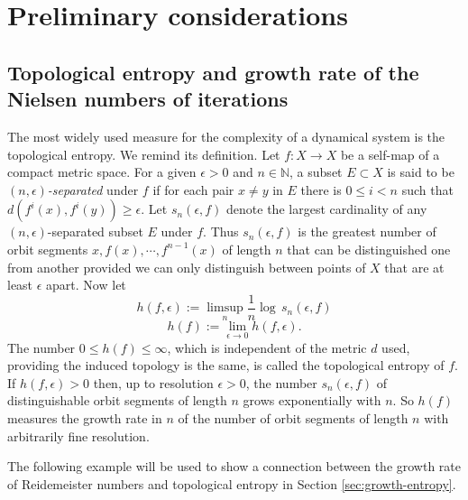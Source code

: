 \documentclass[12pt, a4paper]{amsart}
\def\N{{\mathbb N}}
\begin{document}
\section{Preliminary considerations }\label{sec:preliminary}

\subsection{Topological entropy and  growth rate  of the Nielsen numbers of iterations}\label{EC}

The most widely used measure for the complexity of a dynamical system is the topological
entropy. We remind its definition.
Let $ f: X \rightarrow X $ be a self-map of a compact metric space. For a given $\epsilon > 0 $
and $ n \in \N$, a subset $E \subset X$ is said to be \emph{$(n,\epsilon)$-separated} under $f$ if for
each pair $x \not= y$ in $E$ there is $0 \leq i <n $ such that $ d(f^i(x), f^i(y)) \geq \epsilon$.
Let $s_n(\epsilon,f)$  denote the largest cardinality of any $(n,\epsilon)$-separated subset $E$
under $f$. Thus  $s_n(\epsilon,f)$ is the greatest number of orbit segments ${x,f(x),\cdots,f^{n-1}(x)}$
of length $n$ that can be distinguished one from another provided we can only distinguish
between points of $X$ that are  at least $\epsilon$ apart.
Now let
$$
  h(f,\epsilon):= \limsup_{n} \frac{1}{n}\log \,s_n(\epsilon,f)
$$
$$
  h(f):=\lim_{\epsilon \rightarrow 0} h(f,\epsilon).
$$
The number $0\leq h(f) \leq \infty $, which is independent of the metric $d$ used,
providing the induced topology is the same,
is called the topological entropy of $f$.
If $ h(f,\epsilon)> 0$ then, up to resolution $ \epsilon >0$, the number $s_n(\epsilon,f)$ of
distinguishable orbit segments of length $n$ grows exponentially with $n$. So $h(f)$
measures the growth rate in $n$ of the number of orbit segments of length $n$
with arbitrarily fine resolution.

The following example will be used to show a connection between the growth rate of Reidemeister numbers and topological entropy in Section \ref{sec:growth-entropy}.
\end{document}
